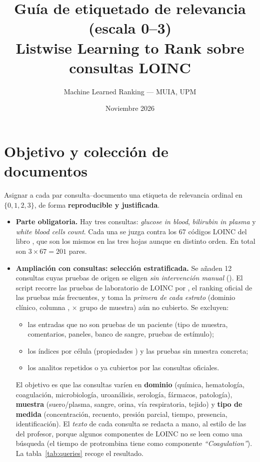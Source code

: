\documentclass[11pt,a4paper]{article}
\title{Guía de etiquetado de relevancia (escala 0--3)\\[2pt]
\large Listwise Learning to Rank sobre consultas LOINC}
\author{Machine Learned Ranking --- MUIA, UPM}
\date{Noviembre 2026}
\begin{document}
\maketitle

\section{Objetivo y colección de documentos}

Asignar a cada par consulta--documento una etiqueta de relevancia ordinal en $\{0,1,2,3\}$, de forma
\textbf{reproducible y justificada}.

\begin{itemize}
\item \textbf{Parte obligatoria.} Hay tres consultas: \emph{glucose in blood}, \emph{bilirubin in plasma} y
  \emph{white blood cells count}. Cada una se juzga contra los 67 códigos LOINC del libro ,
  que son los mismos en las tres hojas aunque en distinto orden. En total son $3\times67=201$ pares.
\item \textbf{Ampliación con consultas: selección estratificada.} Se añaden 12 consultas cuyas pruebas de origen se eligen
  \emph{sin intervención manual} (). El script recorre las pruebas de laboratorio de LOINC por
  , el ranking oficial de las pruebas más frecuentes, y toma la \emph{primera de cada estrato}
  (dominio clínico, columna , $\times$ grupo de muestra) aún no cubierto. Se excluyen:
  \begin{itemize}
  \item las entradas que no son pruebas de un paciente (tipo de muestra, comentarios, paneles, banco de sangre, pruebas de estímulo);
  \item los índices por célula (propiedades ) y las pruebas sin muestra concreta;
  \item los analitos repetidos o ya cubiertos por las consultas oficiales.
  \end{itemize}
  El objetivo es que las consultas varíen en \textbf{dominio} (química, hematología, coagulación, microbiología, uroanálisis,
  serología, fármacos, patología), \textbf{muestra} (suero/plasma, sangre, orina, vía respiratoria, tejido) y \textbf{tipo de medida}
  (concentración, recuento, presión parcial, tiempo, presencia, identificación).
  El \emph{texto} de cada consulta se redacta a mano, al estilo de las del profesor, porque algunos componentes de LOINC no se leen
  como una búsqueda (el tiempo de protrombina tiene como componente \emph{``Coagulation''}). La tabla~\ref{tab:queries} recoge el resultado.

\end{itemize}
\end{document}
